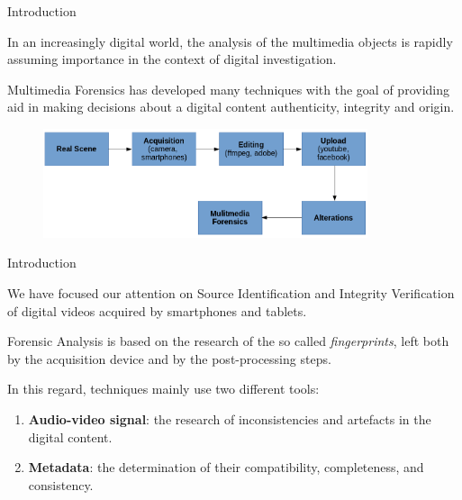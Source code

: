 \begin{tframe}{Introduction}

\vspace{0.2cm}

In an increasingly digital world, the analysis of the multimedia objects is rapidly assuming importance in the context of digital investigation.

\vspace{0.2cm}

Multimedia Forensics has developed many techniques with the goal of providing aid in making decisions about a digital content authenticity, integrity and origin.

\begin{figure}
\centering
    \includegraphics[width=0.85\textwidth]{images/workflow.png}
\end{figure}

\end{tframe}

\begin{tframe}{Introduction}

\vspace{0.2cm}

We have focused our attention on Source Identification and Integrity Verification of digital videos acquired by smartphones and tablets.

\vspace{0.5cm}

Forensic Analysis is based on the research of the so called \emph{fingerprints}, left both by the acquisition device and by the post-processing steps.

\vspace{0.5cm}

In this regard, techniques mainly use two different tools:

\begin{enumerate}
\item \textbf{Audio-video signal}: the research of inconsistencies and artefacts in the digital content.
\item \textbf{Metadata}: the determination of their compatibility, completeness, and consistency.
\end{enumerate}

\end{tframe}

